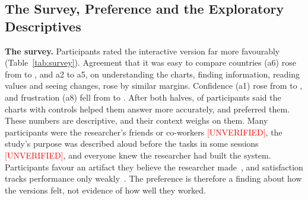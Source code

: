 \documentclass[10pt,twocolumn]{article}
\newcommand{\unverified}{\textcolor{red}{[UNVERIFIED]}}
\begin{document}
\subsection{The Survey, Preference and the Exploratory Descriptives}
\label{sec:survey}

\textbf{The survey.} Participants rated the interactive version far more favourably (Table~\ref{tab:survey}). Agreement that it was easy to compare countries (a6) rose from  to , and a2 to a5, on understanding the charts, finding information, reading values and seeing changes, rose by similar margins. Confidence (a1) rose from  to , and frustration (a8) fell from  to . After both halves,  of  participants said the charts with controls helped them answer more accurately, and  preferred them. These numbers are descriptive, and their context weighs on them. Many participants were the researcher's friends or co-workers \unverified, the study's purpose was described aloud before the tasks in some sessions \unverified, and everyone knew the researcher had built the system. Participants favour an artifact they believe the researcher made~\cite{dell2012}, and satisfaction tracks performance only weakly~\cite{hornbaek2007}. The preference is therefore a finding about how the versions felt, not evidence of how well they worked.
\end{document}
